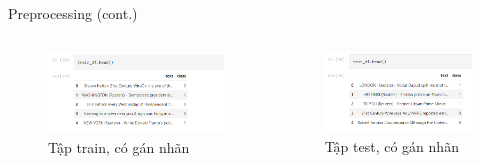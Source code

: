 \documentclass[aspectratio=169,xcolor=dvipsnames]{beamer}
\begin{document}
\begin{frame}{Preprocessing (cont.)}
\begin{columns}[c]
\begin{figure}
\includegraphics[width=0.98\linewidth]{img/train-csv.PNG}
\caption{Tập train, có gán nhãn}
\end{figure}

\begin{figure}
\includegraphics[width=0.9\linewidth]{img/test-csv.PNG}
\caption{Tập test, có gán nhãn}
\end{figure}
\end{columns}
\end{frame}
\end{document}
